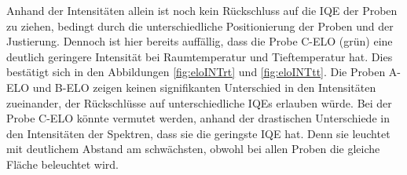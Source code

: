 \noindent 
\newline
Anhand der Intensitäten allein ist noch kein Rückschluss auf die IQE der Proben zu ziehen, bedingt durch die unterschiedliche Positionierung der Proben und der Justierung. Dennoch ist hier bereits auffällig, dass die Probe C-ELO (grün) eine deutlich geringere Intensität bei Raumtemperatur und Tieftemperatur hat.
Dies bestätigt sich in den Abbildungen \ref{fig:eloINTrt} und \ref{fig:eloINTtt}.
\newline
Die Proben A-ELO und B-ELO zeigen keinen signifikanten Unterschied in den Intensitäten zueinander, der Rückschlüsse auf unterschiedliche IQEs erlauben würde. Bei der Probe C-ELO könnte vermutet werden, anhand der drastischen Unterschiede in den Intensitäten der Spektren, dass sie die geringste IQE hat. Denn sie leuchtet mit deutlichem Abstand am schwächsten, obwohl bei allen Proben die gleiche Fläche beleuchtet wird. 
